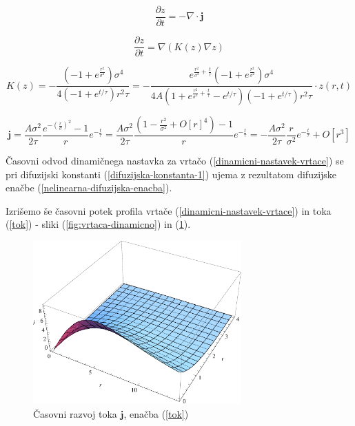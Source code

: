 \documentclass[a4paper, oneside, 12pt]{book}
\begin{document}
  \begin{equation}
    \frac{\partial z}{\partial t} = - \nabla \cdot \mathbf{j}
    \label{kontinuitetna-enacba}
  \end{equation}

  \begin{equation}
    \frac{\partial z}{\partial t} = \nabla (K(z) \nabla z)
    \label{nelinearna-difuzijska-enacba}
  \end{equation}

  \begin{equation}
    K(z) = -\frac{\left(-1+e^{\frac{r^2}{\sigma ^2}}\right) \sigma ^4}{4 \left(-1+e^{t/\tau }\right) r^2 \tau } = -\frac{e^{\frac{r^2}{\sigma ^2}+\frac{t}{\tau }} \left(-1+e^{\frac{r^2}{\sigma ^2}}\right) \sigma ^4}{4 A \left(1+e^{\frac{r^2}{\sigma ^2}+\frac{t}{\tau }}-e^{t/\tau }\right) \left(-1+e^{t/\tau }\right) r^2 \tau } \cdot z(r,t)
    \label{difuzijska-konstanta-1}
  \end{equation}

  \begin{equation}
    \mathbf{j} = \frac{A \sigma^2}{2 \tau} \frac{e^{-(\frac{r}{\sigma})^2}-1}{r} e^{-\frac{t}{\tau}} = \frac{A \sigma^2}{2 \tau} \frac{\left( 1-\frac{r^2}{\sigma ^2}+O[r]^4 \right)-1}{r} e^{-\frac{t}{\tau}} = -\frac{A \sigma^2}{2 \tau} \frac{r}{\sigma ^2} e^{-\frac{t}{\tau}} + O[r^3]
    \label{tok}
  \end{equation}

  Časovni odvod dinamičnega nastavka za vrtačo (\ref{dinamicni-nastavek-vrtace}) se pri difuzijski konstanti (\ref{difuzijska-konstanta-1}) ujema z rezultatom difuzijske enačbe (\ref{nelinearna-difuzijska-enacba}).

  Izrišemo še časovni potek profila vrtače (\ref{dinamicni-nastavek-vrtace}) in toka (\ref{tok}) - sliki (\ref{fig:vrtaca-dinamicno}) in (\ref{fig:tok-dinamicno}).

  \begin{figure}[H]
    \begin{center}
      \includegraphics[width=8cm]{slike/tok-dinamicno}
    \end{center}
    \caption{Časovni razvoj toka $\mathbf{j}$, enačba (\ref{tok})}
    \label{fig:tok-dinamicno}
  \end{figure}
\end{document}
